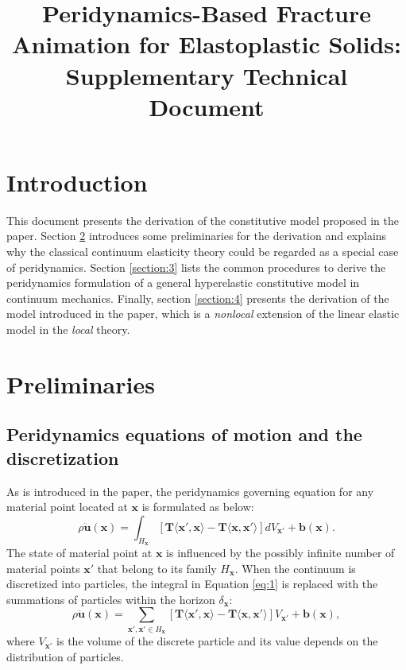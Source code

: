 \documentclass[11pt,fullpage]{article}
\title{Peridynamics-Based Fracture Animation for Elastoplastic Solids:\\
      Supplementary Technical Document}
\newcommand{\mb}[1]{\mathbf{#1}}
\newcommand{\blue}[1]{#1}
\begin{document}
\maketitle

\section{Introduction}

This document presents the derivation of the constitutive model proposed in the paper. Section \blue{\ref{section:2}} introduces some preliminaries for the derivation and explains why the classical continuum elasticity theory could be regarded as a special case of peridynamics. Section \blue{\ref{section:3}} lists the common procedures to derive the peridynamics formulation of a general hyperelastic constitutive model in continuum mechanics. Finally, section \blue{\ref{section:4}} presents the derivation of the model introduced in the paper, which is a \emph{nonlocal} extension of the linear elastic model in the \emph{local} theory.

\section{Preliminaries}\label{section:2}

\subsection{Peridynamics equations of motion and the discretization}

As is introduced in the paper, the peridynamics governing equation for any material point located at $\mb{x}$ is formulated as below:
\begin{equation}
\rho\ddot{\mb{u}}(\mb{x}) = \int_{H_\mb{x}}[\mb{T}\langle\mb{x}',\mb{x}\rangle - \mb{T}\langle\mb{x},\mb{x}'\rangle]dV_{\mb{x}'}+\mb{b}(\mb{x}).
\label{eq:1}
\end{equation}
The state of material point at $\mb{x}$ is influenced by the possibly infinite number of material points $\mb{x}'$ that belong to its family $H_\mb{x}$. When the continuum is discretized into particles, the integral in Equation \blue{\ref{eq:1}} is replaced with the summations of particles within the horizon $\delta_\mb{x}$:
\begin{equation}
\rho\ddot{\mb{u}}(\mb{x}) = \sum_{\mb{x}',\mb{x}'\in H_\mb{x}}[\mb{T}\langle\mb{x}',\mb{x}\rangle - \mb{T}\langle\mb{x},\mb{x}'\rangle]V_{\mb{x}'}+\mb{b}(\mb{x}),
\label{eq:2}
\end{equation}
where $V_{\mb{x}'}$ is the volume of the discrete particle and its value depends on the distribution of particles.
\end{document}
